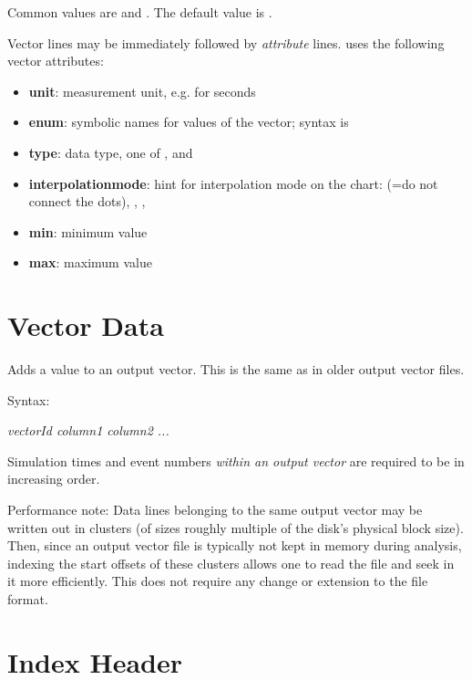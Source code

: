 Common values are  and . The default value is .

Vector lines may be immediately followed by \textit{attribute} lines.
{\opp} uses the following vector attributes:

\begin{itemize}
    \item \textbf{unit}: measurement unit, e.g.  for seconds
    \item \textbf{enum}: symbolic names for values of the vector;
          syntax is 
    \item \textbf{type}: data type, one of ,  and 
    \item \textbf{interpolationmode}: hint for interpolation mode on the
          chart:  (=do not connect the dots), ,
          , 
    \item \textbf{min}: minimum value
    \item \textbf{max}: maximum value
\end{itemize}




\section{Vector Data}

Adds a value to an output vector. This is the same as in older output
vector files.

Syntax:

\hspace{20mm} {\itshape vectorId column1 column2 ...}

Simulation times and event numbers \textit{within an output vector} are
required to be in increasing order.

Performance note: Data lines belonging to the same output vector may be
written out in clusters (of sizes roughly multiple of the disk's
physical block size). Then, since an output vector file is typically
not kept in memory during analysis, indexing the start offsets of these
clusters allows one to read the file and seek in it more efficiently.
This does not require any change or extension to the file format.

\section{Index Header}

